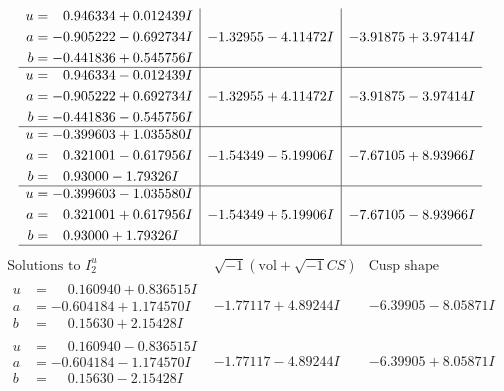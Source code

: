 \documentclass[1p]{elsarticle_modified}
\theoremstyle{definition}
\newcommand{\I}{\sqrt{-1}}
\begin{document}
$$\begin{array}{c|c|c}
\begin{aligned}
u &= \phantom{-}0.946334 + 0.012439 I \\
a &= -0.905222 - 0.692734 I \\
b &= -0.441836 + 0.545756 I\end{aligned}
 & -1.32955 - 4.11472 I & -3.91875 + 3.97414 I \\ \hline\begin{aligned}
u &= \phantom{-}0.946334 - 0.012439 I \\
a &= -0.905222 + 0.692734 I \\
b &= -0.441836 - 0.545756 I\end{aligned}
 & -1.32955 + 4.11472 I & -3.91875 - 3.97414 I \\ \hline\begin{aligned}
u &= -0.399603 + 1.035580 I \\
a &= \phantom{-}0.321001 - 0.617956 I \\
b &= \phantom{-}0.93000 - 1.79326 I\end{aligned}
 & -1.54349 - 5.19906 I & -7.67105 + 8.93966 I \\ \hline\begin{aligned}
u &= -0.399603 - 1.035580 I \\
a &= \phantom{-}0.321001 + 0.617956 I \\
b &= \phantom{-}0.93000 + 1.79326 I\end{aligned}
 & -1.54349 + 5.19906 I & -7.67105 - 8.93966 I\\
 \hline 
 \end{array}$$\newpage$$\begin{array}{c|c|c}  
\text{Solutions to }I^u_{2}& \I (\text{vol} + \sqrt{-1}CS) & \text{Cusp shape}\\
 \hline 
\begin{aligned}
u &= \phantom{-}0.160940 + 0.836515 I \\
a &= -0.604184 + 1.174570 I \\
b &= \phantom{-}0.15630 + 2.15428 I\end{aligned}
 & -1.77117 + 4.89244 I & -6.39905 - 8.05871 I \\ \hline\begin{aligned}
u &= \phantom{-}0.160940 - 0.836515 I \\
a &= -0.604184 - 1.174570 I \\
b &= \phantom{-}0.15630 - 2.15428 I\end{aligned}
 & -1.77117 - 4.89244 I & -6.39905 + 8.05871 I \\ \hline\begin{aligned}

\end{aligned}
\end{array}$$
\end{document}
